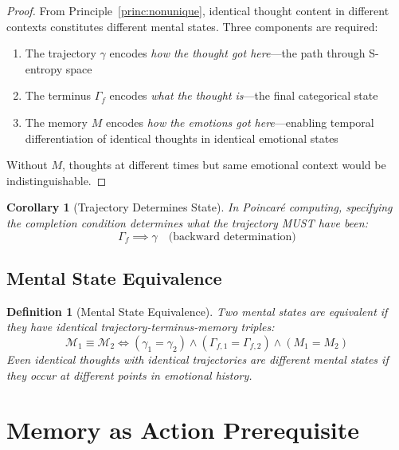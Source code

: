 \documentclass[aps,prd,twocolumn,superscriptaddress,floatfix,nofootinbib]{revtex4-2}
\newtheorem{corollary}[theorem]{Corollary}
\newtheorem{definition}[theorem]{Definition}
\theoremstyle{remark}
\newcommand{\Gstate}{\Gamma}
\newcommand{\Mstate}{\mathcal{M}}
\begin{document}
\begin{proof}
From Principle~\ref{princ:nonunique}, identical thought content in different contexts constitutes different mental states. Three components are required:
\begin{enumerate}
\item The trajectory $\gamma$ encodes \emph{how the thought got here}---the path through S-entropy space
\item The terminus $\Gstate_f$ encodes \emph{what the thought is}---the final categorical state
\item The memory $M$ encodes \emph{how the emotions got here}---enabling temporal differentiation of identical thoughts in identical emotional states
\end{enumerate}
Without $M$, thoughts at different times but same emotional context would be indistinguishable.
\end{proof}

\begin{corollary}[Trajectory Determines State]
\label{cor:trajectory_determines}
In Poincar\'{e} computing, specifying the completion condition determines what the trajectory MUST have been:
\begin{equation}
\Gstate_f \implies \gamma \quad \text{(backward determination)}
\end{equation}
\end{corollary}

\subsection{Mental State Equivalence}

\begin{definition}[Mental State Equivalence]
Two mental states are equivalent if they have identical trajectory-terminus-memory triples:
\begin{equation}
\Mstate_1 \equiv \Mstate_2 \iff (\gamma_1 = \gamma_2) \land (\Gstate_{f,1} = \Gstate_{f,2}) \land (M_1 = M_2)
\end{equation}
Even identical thoughts with identical trajectories are \emph{different} mental states if they occur at different points in emotional history.
\end{definition}

\section{Memory as Action Prerequisite}
\label{sec:action_prerequisite}
\end{document}
